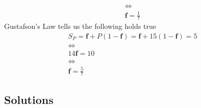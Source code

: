 \documentclass[main.tex]{subfiles}
\begin{document}
\begin{ExerciseList}
\begin{gather*}
                \Longleftrightarrow\\
                \mathbf{f} = \frac{1}{7}
            \end{gather*}
        \Question Gustafson's Law tells us the following holds true
            \begin{gather*}
                S_P = \mathbf{f} + P (1 - \mathbf{f})
                    = \mathbf{f} + 15 (1 - \mathbf{f})
                    = 5 \\
                \Longleftrightarrow\\
                14 \mathbf{f} = 10\\
                \Longleftrightarrow\\
                \mathbf{f} = \frac{5}{7}
            \end{gather*}

\end{ExerciseList}
\newpage
\subsection{Solutions}
\shipoutAnswer
\end{document}
